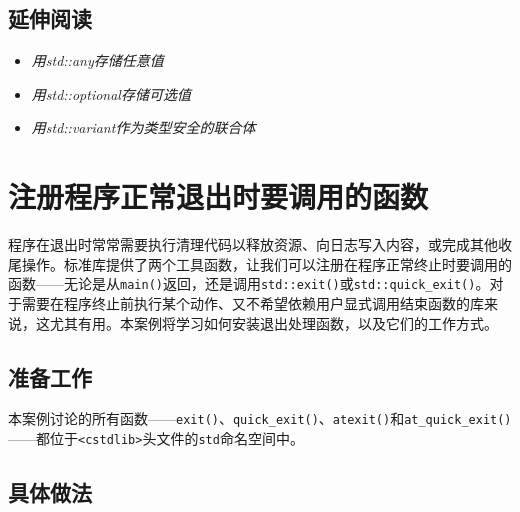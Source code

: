 
\subsection{延伸阅读}



\begin{itemize}
\item \textit{用std::any存储任意值}



\item \textit{用std::optional存储可选值}



\item \textit{用std::variant作为类型安全的联合体}

\end{itemize}



\section{注册程序正常退出时要调用的函数}



程序在退出时常常需要执行清理代码以释放资源、向日志写入内容，或完成其他收尾操作。标准库提供了两个工具函数，让我们可以注册在程序正常终止时要调用的函数——无论是从\texttt{main()}返回，还是调用\texttt{std::\allowbreak{}exit()}或\texttt{std::\allowbreak{}quick\_\allowbreak{}exit()}。对于需要在程序终止前执行某个动作、又不希望依赖用户显式调用结束函数的库来说，这尤其有用。本案例将学习如何安装退出处理函数，以及它们的工作方式。



\subsection{准备工作}



本案例讨论的所有函数——\texttt{exit()}、\texttt{quick\_\allowbreak{}exit()}、\texttt{atexit()}和\texttt{at\_\allowbreak{}quick\_\allowbreak{}exit()}——都位于\texttt{<\allowbreak{}cstdlib>}头文件的\texttt{std}命名空间中。



\subsection{具体做法}


